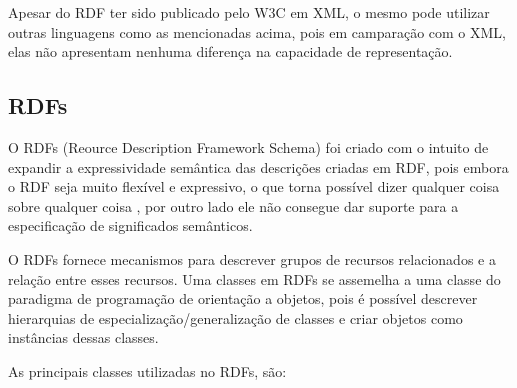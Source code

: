 Apesar do RDF ter sido publicado pelo W3C em XML, o mesmo pode utilizar outras
linguagens como as mencionadas acima, pois em camparação com o XML, elas não
apresentam nenhuma diferença na capacidade de representação.

\subsection{RDFs}
\label{sec:rdfs}

O RDFs (Reource Description Framework Schema) foi criado com o intuito de
expandir a expressividade semântica das
descrições criadas em RDF, pois embora o RDF seja muito flexível e expressivo,
o que torna possível dizer qualquer coisa sobre qualquer coisa
\cite{hebeler2011semantic}, por outro lado ele não consegue dar suporte para
a especificação de significados semânticos.

O RDFs fornece mecanismos para descrever grupos de recursos relacionados e a
relação entre esses recursos. Uma classes em RDFs se
assemelha a uma classe do paradigma de programação de orientação a objetos, pois
é possível descrever hierarquias de especialização/generalização de classes e
criar objetos como instâncias dessas classes.

As principais classes utilizadas no RDFs, são:

